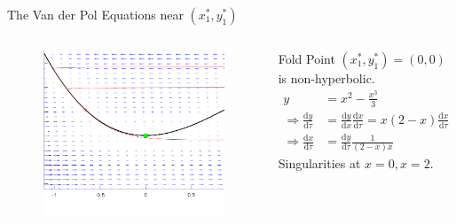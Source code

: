 \documentclass[11pt]{beamer}
\newcommand{\dif}{\mathrm{d}}
\begin{document}
\begin{frame}{The Van der Pol Equations near $(x_1^*,y_1^*)$}
\begin{columns}
\begin{figure}[h!]
    \centering
    \includegraphics[width=\textwidth]{PPlanecrop.png}
\end{figure}
Fold Point $(x_1^*,y_1^*)= (0,0) $  
\newline
is non-hyperbolic.
\begin{align*}
y&= x^2 - \frac{x^3}{3}\\
\Rightarrow \frac{\dif y}{\dif \tau}  &= \frac{\dif y}{\dif x} \frac{\dif x}{\dif\tau}  = x(2-x)\frac{\dif x}{\dif\tau}\\
\Rightarrow \frac{\dif x}{\dif\tau}&= \frac{\dif y}{\dif\tau}\frac{1}{(2-x)x}
\end{align*}
\newline
Singularities at $x=0,x=2$.
\end{columns}
\end{frame}
\end{document}
